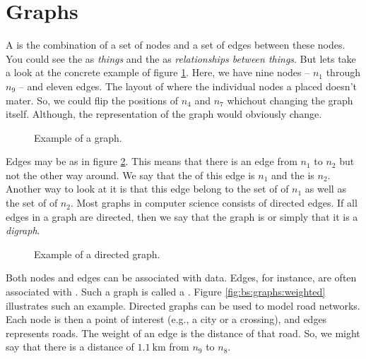 \section{Graphs}
\label{sec:bg:graph}

A  is the combination of a set of nodes and a set of edges between these nodes. You could see the  as \textsl{things} and the  as \textsl{relationships between things}. But lets take a look at the concrete example of figure \ref{fig:bs:graphs:graph}. Here, we have nine nodes -- $n_1$ through $n_9$ -- and eleven edges. The layout of where the individual nodes a placed doesn't mater. So, we could flip the positions of $n_4$ and $n_7$ whichout changing the graph itself. Although, the representation of the graph would obviously change.

\begin{figure}[tbp]
  
  \caption{Example of a graph.}
  \label{fig:bs:graphs:graph}
\end{figure}

Edges may be  as in figure \ref{fig:bs:graphs:directed}. This means that there is an edge from $n_1$ to $n_2$ but not the other way around. We say that the  of this edge is $n_1$ and the  is $n_2$. Another way to look at it is that this edge belong to the set of  of $n_1$ as well as the set of  of $n_2$. Most graphs in computer science consists of directed edges. If all edges in a graph are directed, then we say that the graph is  or simply that it is a \textsl{digraph}.

\begin{figure}[tbp]
  
  \caption{Example of a directed graph.}
  \label{fig:bs:graphs:directed}
\end{figure}

Both nodes and edges can be associated with data. Edges, for instance, are often associated with . Such a graph is called a . Figure \ref{fig:bs:graphs:weighted} illustrates such an example. Directed graphs can be used to model road networks. Each node is then a point of interest (e.g., a city or a crossing), and edges represents roads. The weight of an edge is the distance of that road. So, we might say that there is a distance of $1.1~\mathrm{km}$ from $n_9$ to $n_8$.

